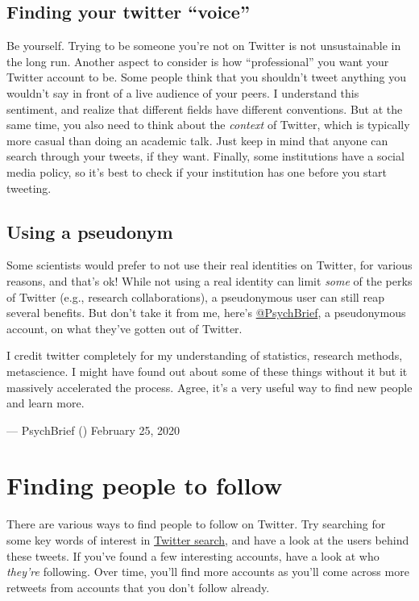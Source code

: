 \documentclass[]{book}
\begin{document}
\hypertarget{finding-your-twitter-voice}{%
\subsection{Finding your twitter ``voice''}\label{finding-your-twitter-voice}}

Be yourself. Trying to be someone you're not on Twitter is not unsustainable in the long run. Another aspect to consider is how ``professional'' you want your Twitter account to be. Some people think that you shouldn't tweet anything you wouldn't say in front of a live audience of your peers. I understand this sentiment, and realize that different fields have different conventions. But at the same time, you also need to think about the \emph{context} of Twitter, which is typically more casual than doing an academic talk. Just keep in mind that anyone can search through your tweets, if they want. Finally, some institutions have a social media policy, so it's best to check if your institution has one before you start tweeting.

\hypertarget{using-a-pseudonym}{%
\subsection{Using a pseudonym}\label{using-a-pseudonym}}

Some scientists would prefer to not use their real identities on Twitter, for various reasons, and that's ok! While not using a real identity can limit \emph{some} of the perks of Twitter (e.g., research collaborations), a pseudonymous user can still reap several benefits. But don't take it from me, here's \href{https://twitter.com/PsychBrief}{@PsychBrief}, a pseudonymous account, on what they've gotten out of Twitter.

I credit twitter completely for my understanding of statistics, research methods, metascience. I might have found out about some of these things without it but it massively accelerated the process. Agree, it's a very useful way to find new people and learn more.

--- PsychBrief (\citet{PsyBrief}) February 25, 2020

\hypertarget{finding-people-to-follow}{%
\section{Finding people to follow}\label{finding-people-to-follow}}

There are various ways to find people to follow on Twitter. Try searching for some key words of interest in \href{https://help.twitter.com/en/using-twitter/twitter-search}{Twitter search}, and have a look at the users behind these tweets. If you've found a few interesting accounts, have a look at who \emph{they're} following. Over time, you'll find more accounts as you'll come across more retweets from accounts that you don't follow already.
\end{document}
